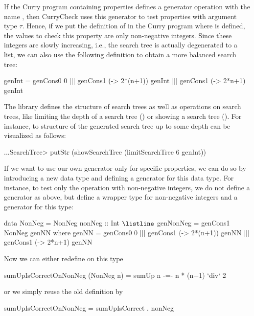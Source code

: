 If the Curry program containing properties defines a generator
operation with the name ,
then CurryCheck uses this generator to test properties
with argument type $\tau$.
Hence, if we put the definition of 
in the Curry program where  is defined,
the values to check this property are only non-negative integers.
Since these integers are slowly increasing, i.e., the search tree
is actually degenerated to a list, we can also use
the following definition to obtain a more balanced search tree:
%
\begin{curry}
genInt = genCons0 0 ||| genCons1 (\n -> 2*(n+1)) genInt
                    ||| genCons1 (\n -> 2*n+1)   genInt
\end{curry}
The library  defines the structure of search trees
as well as operations on search trees, like limiting the depth
of a search tree () or showing a search tree
(). For instance, to structure
of the generated search tree up to some depth
can be visualized as follows:
\begin{curry}
...SearchTree> putStr (showSearchTree (limitSearchTree 6 genInt))
\end{curry}
%
If we want to use our own generator only for specific properties,
we can do so by introducing a new data type and defining a generator
for this data type.
For instance, to test only the operation  with non-negative
integers, we do not define a generator  as above,
but define a wrapper type for non-negative integers and
a generator for this type:
%
\begin{curry}
data NonNeg = NonNeg { nonNeg :: Int }$\listline$
genNonNeg = genCons1 NonNeg genNN
 where
   genNN = genCons0 0 ||| genCons1 (\n -> 2*(n+1)) genNN
                      ||| genCons1 (\n -> 2*n+1)   genNN
\end{curry}
Now we can either redefine  on this type
\begin{curry}
sumUpIsCorrectOnNonNeg (NonNeg n) = sumUp n -=- n * (n+1) `div` 2
\end{curry}
or we simply reuse the old definition by
\begin{curry}
sumUpIsCorrectOnNonNeg = sumUpIsCorrect . nonNeg
\end{curry}

